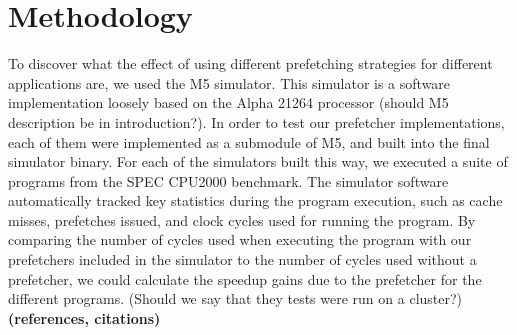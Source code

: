 
\section{Methodology}
\label{sec:methodology}

To discover what the effect of using different prefetching strategies
for different applications are, we used the M5 simulator. This
simulator is a software implementation loosely based on the Alpha
21264 processor \cite{TDT4260 Staff} (should M5 description be in
introduction?). In order to test our prefetcher implementations, each
of them were implemented as a submodule of M5, and built into the
final simulator binary. For each of the simulators built this way, we
executed a suite of programs from the SPEC CPU2000 benchmark. The
simulator software automatically tracked key statistics during the
program execution, such as cache misses, prefetches issued, and clock
cycles used for running the program. By comparing the number of cycles
used when executing the program with our prefetchers included in the
simulator to the number of cycles used without a prefetcher, we could
calculate the speedup gains due to the prefetcher for the different
programs. (Should we say that they tests were run on a cluster?)
{\bf (references, citations)}

